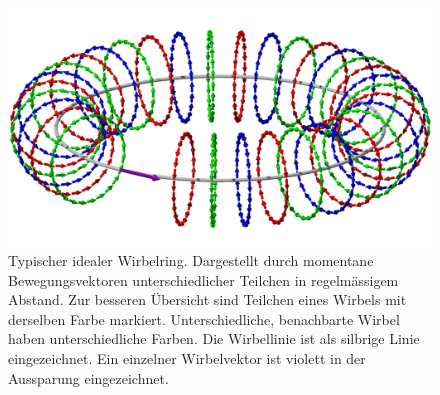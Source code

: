 \begin{figure}
\centering
\includegraphics[width=1\textwidth]{papers/wirbelringe/fig/wirbelring_RGB.jpg}
\caption{Typischer idealer Wirbelring.
Dargestellt durch momentane Bewegungsvektoren unterschiedlicher Teilchen in regelmässigem Abstand.
Zur besseren Übersicht sind Teilchen eines Wirbels mit derselben Farbe markiert.
Unterschiedliche, benachbarte Wirbel haben unterschiedliche Farben.
Die Wirbellinie ist als silbrige Linie eingezeichnet.
Ein einzelner Wirbelvektor ist violett in der Aussparung eingezeichnet.\label{Wirbelringe:fig:generell}}
\end{figure}